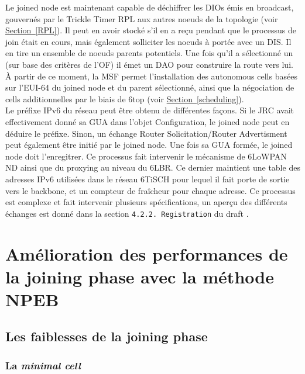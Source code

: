 \documentclass[]{report}
\newcommand{\wordlink}[2]{\hyperref[#2]{#1~\ref{#2}}}
\begin{document}
Le joined node est maintenant capable de déchiffrer les DIOs émis en broadcast, gouvernés par le Trickle Timer RPL aux autres noeuds de la topologie (voir \wordlink{Section}{RPL}). Il peut en avoir stocké s'il en a reçu pendant que le processus de join était en cours, mais également solliciter les noeuds à portée avec un DIS. Il en tire un ensemble de noeuds parents potentiels. Une fois qu'il a sélectionné un (sur base des critères de l'OF) il émet un DAO pour construire la route vers lui. À partir de ce moment, la MSF permet l'installation des autonomous cells basées sur l'EUI-64 du joined node et du parent sélectionné, ainsi que la négociation de cells additionnelles par le biais de 6top (voir \wordlink{Section}{scheduling}).\\

Le préfixe IPv6 du réseau peut être obtenu de différentes façons. Si le JRC avait effectivement donné sa GUA dans l'objet Configuration, le joined node peut en déduire le préfixe. Sinon, un échange Router Solicitation/Router Advertisment peut également être initié par le joined node. Une fois sa GUA formée, le joined node doit l'enregitrer. Ce processus fait intervenir le mécanisme de 6LoWPAN ND ainsi que du proxying au niveau du 6LBR. Ce dernier maintient une table des adresses IPv6 utilisées dans le réseau 6TiSCH pour lequel il fait porte de sortie vers le backbone, et un compteur de fraîcheur pour chaque adresse. Ce processus est complexe et fait intervenir plusieurs spécifications, un aperçu des différents échanges est donné dans la section \texttt{4.2.2.  Registration} du draft \cite{ietf-6tisch-architecture-28}.

\newpage

\chapter{Amélioration des performances de la joining phase avec la méthode NPEB}
\label{chap_NPEB}
\newpage

\section{Les faiblesses de la joining phase}
\label{prob_joining_phase}

\subsection{La \textit{minimal cell}}
\label{min_cell}
\end{document}
